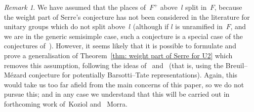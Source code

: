 \documentclass{amsart}
\theoremstyle{definition}
\theoremstyle{remark}
\newtheorem{rem}[subsubsection]{Remark}
\begin{document}
\begin{rem}
  \label{rem: allowing places above p to ramify}We have assumed that
  the places of~$F^+$ above~$l$ split in~$F$, because the weight part
  of Serre's conjecture has not been considered in the literature for
  unitary groups which do not split above~$l$ (although if $l$ is
  unramified in~$F$, and we are in the generic semisimple case, such a
  conjecture is a special case of the conjectures
  of~\cite{2015arXiv150902527G}). However, it seems likely that it is
  possible to formulate and prove a generalisation of
  Theorem~\ref{thm: weight part of Serre for U2} which removes this
  assumption, following the ideas of~\cite{MR3292675}
  and~\cite{MR3449190} (that is, using the Breuil--M\'ezard conjecture
  for potentially Barsotti--Tate representations). Again, this would
  take us too far afield from the main concerns of this paper, so we
  do not pursue this; and in any case we understand that this will be
  carried out in forthcoming work of~Koziol and~ Morra.
\end{rem}








 
\end{document}
